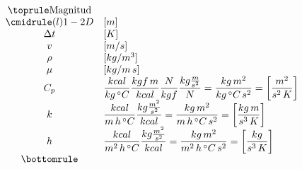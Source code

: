 \begin{enumerate}
\begin{equation*}
\begin{array}{@{}cl@{}}
        \toprule
        \text{Magnitud} & \\
        \cmidrule(l){1-2}
        D & [m] \\
        \Delta{t} & [K] \\
        v & [m/s] \\
        \rho & [kg/m^3] \\
        \mu & [kg/m\,s] \\
        C_p & \dfrac{kcal}{kg\,^{\circ}C}
              \dfrac{kgf\,m}{kcal}
              \dfrac{N}{kgf}
              \dfrac{kg\frac{m}{s^2}}{N}
        =\dfrac{kg\,m^2}{kg\,^{\circ}C\,s^2}
        =\left[\dfrac{m^2}{s^2\,K}\right]\\
        k & \dfrac{kcal}{m\,h\,^{\circ}C}
            \dfrac{kg\frac{m^2}{s^2}}{kcal}
        =\dfrac{kg\,m^2}{m\,h\,^{\circ}C\,s^2}
        =\left[\dfrac{kg\,m}{s^3\,K}\right]\\
        h & \dfrac{kcal}{m^2\,h\,^{\circ}C}
            \dfrac{kg\frac{m^2}{s^2}}{kcal}
        =\dfrac{kg\,m^2}{m^2\,h\,^{\circ}C\,s^2}
        =\left[\dfrac{kg}{s^3\,K}\right]\\
        \bottomrule
        \end{array}
        \end{equation*}
\end{enumerate}

